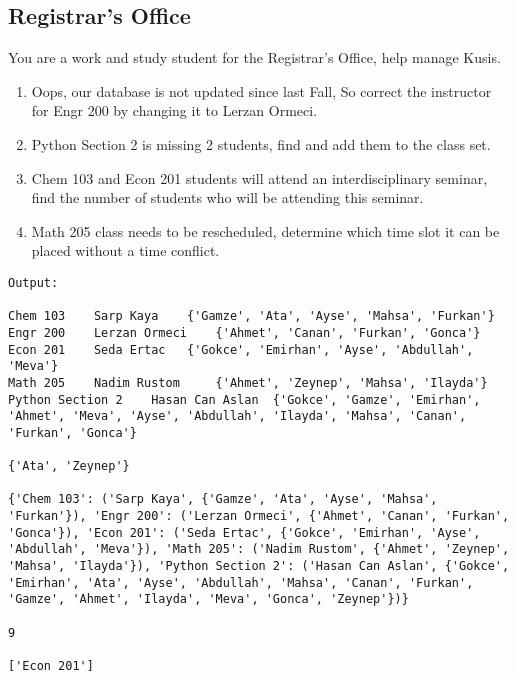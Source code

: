 \documentclass[a4paper]{article}
\begin{document}
\subsection{Registrar's Office}
You are a work and study student for the Registrar's Office, help manage Kusis.
\begin{enumerate}
    \item Oops, our database is not updated since last Fall, So correct the instructor for Engr 200 by changing it to Lerzan Ormeci.
    \item Python Section 2 is missing 2 students, find and add them to the class set. 
    \item Chem 103 and Econ 201 students will attend an interdisciplinary seminar, find the number of students who will be attending this seminar.
    \item Math 205 class needs to be rescheduled, determine which time slot it can be placed without a time conflict.
\end{enumerate}
\newpage
\begin{lstlisting}[language={}]
Output:

Chem 103	Sarp Kaya	 {'Gamze', 'Ata', 'Ayse', 'Mahsa', 'Furkan'}
Engr 200	Lerzan Ormeci	 {'Ahmet', 'Canan', 'Furkan', 'Gonca'}
Econ 201	Seda Ertac	 {'Gokce', 'Emirhan', 'Ayse', 'Abdullah', 'Meva'}
Math 205	Nadim Rustom	 {'Ahmet', 'Zeynep', 'Mahsa', 'Ilayda'}
Python Section 2	Hasan Can Aslan	 {'Gokce', 'Gamze', 'Emirhan', 'Ahmet', 'Meva', 'Ayse', 'Abdullah', 'Ilayda', 'Mahsa', 'Canan', 'Furkan', 'Gonca'}

{'Ata', 'Zeynep'}

{'Chem 103': ('Sarp Kaya', {'Gamze', 'Ata', 'Ayse', 'Mahsa', 'Furkan'}), 'Engr 200': ('Lerzan Ormeci', {'Ahmet', 'Canan', 'Furkan', 'Gonca'}), 'Econ 201': ('Seda Ertac', {'Gokce', 'Emirhan', 'Ayse', 'Abdullah', 'Meva'}), 'Math 205': ('Nadim Rustom', {'Ahmet', 'Zeynep', 'Mahsa', 'Ilayda'}), 'Python Section 2': ('Hasan Can Aslan', {'Gokce', 'Emirhan', 'Ata', 'Ayse', 'Abdullah', 'Mahsa', 'Canan', 'Furkan', 'Gamze', 'Ahmet', 'Ilayda', 'Meva', 'Gonca', 'Zeynep'})}

9

['Econ 201']

\end{lstlisting}
\end{document}
